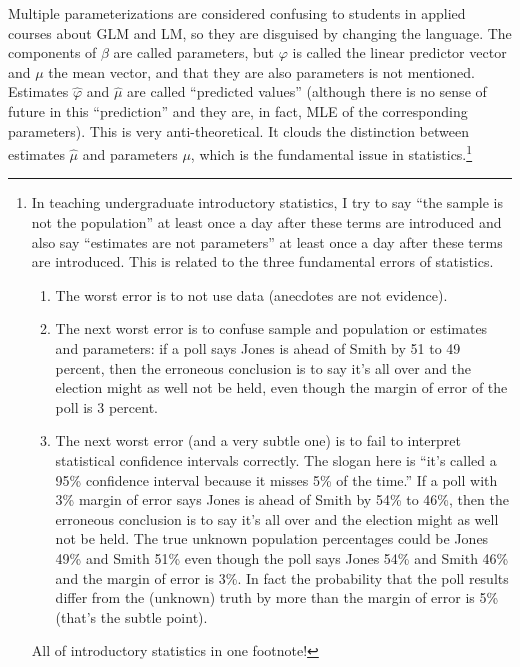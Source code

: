 \documentclass[11pt]{article}
\begin{document}
Multiple parameterizations are considered confusing to students in applied
courses about GLM and LM, so they are disguised
by changing the language.  The components of $\beta$ are called parameters,
but $\varphi$ is called the linear predictor vector and $\mu$ the mean
vector, and that they are also parameters is not mentioned.
Estimates $\hat{\varphi}$ and $\hat{\mu}$ are called
``predicted values'' (although there is no sense of future
in this ``prediction'' and they are, in fact, MLE of the corresponding
parameters).  This is very anti-theoretical.  It clouds
the distinction between estimates $\hat{\mu}$ and parameters $\mu$, which
is the fundamental issue in statistics.\footnote{In teaching undergraduate
introductory statistics, I try to say ``the sample is not the population''
at least once a day after these terms are introduced and also say
``estimates are not parameters''
at least once a day after these terms are introduced.  This is related to
the three fundamental errors of statistics.
\begin{enumerate}
\item The worst error is to not use data (anecdotes are not evidence).
\item The next worst error is to confuse sample and population or estimates
and parameters: if a poll says Jones is ahead of Smith by 51 to 49 percent,
then the erroneous conclusion is to say it's all over and the election might
as well not be held, even though the margin of error of the poll is 3 percent.
\item The next worst error (and a very subtle one) is to fail to interpret
statistical confidence intervals correctly.  The slogan here is ``it's called
a 95\% confidence interval because it misses 5\% of the time.''  If a poll with
3\% margin of error says Jones is ahead of Smith by 54\% to 46\%,
then the erroneous conclusion is to say it's all over and the election might
as well not be held.  The true unknown population percentages could be
Jones 49\% and Smith 51\% even though the poll says Jones 54\% and Smith 46\%
and the margin of error is 3\%.  In fact the probability that the poll results
differ from the (unknown) truth by more than the margin of error is 5\%
(that's the subtle point).
\end{enumerate}
All of introductory statistics in one footnote!\label{foot:intro}}
\end{document}
